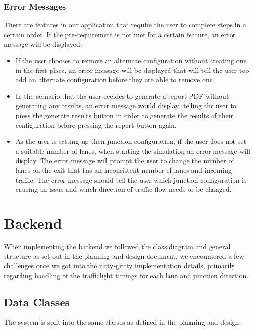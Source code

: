 \documentclass{article}
\begin{document}
    \subsubsection{Error Messages}
    There are features in our application that require the user to complete steps in a certain order.
    If the pre-requirement is not met for a certain feature, an error message will be displayed:
    \begin{itemize}
        \item If the user chooses to remove an alternate configuration without creating one in the first place, an error message will be displayed that will tell the user too add an alternate configuration before they are able to remove one.
        \item In the scenario that the user decides to generate a report PDF without generating any results, an error message would display: telling the user to press the generate results button in order to generate the results of their configuration before pressing the report button again.
        \item As the user is setting up their junction configuration, if the user does not set a suitable number of lanes, when starting the simulation an error message will display. The error message will prompt the user to change the number of lanes on the exit that has an inconsistent number of lanes and incoming traffic. The error message should tell the user which junction configuration is causing an issue and which direction of traffic flow needs to be changed.
    \end{itemize}


    \section{Backend}

    When implementing the backend we followed the class diagram and general structure as set out in the planning and
    design document, we encountered a few challenges once we got into the nitty-gritty implementation details, primarily
    regarding handling of the trafficlight timings for each lane and junction direction.

    \subsection{Data Classes}

    The system is split into the same classes as defined in the planning and design.
\end{document}
